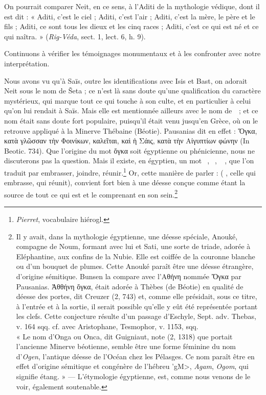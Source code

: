 \documentclass[letterpaper,twocolumn,openany,nodeprecatedcode]{dndbook}
\newcommand*\hieroAAAH{}
\newcommand*\hieroABFY{\raisebox{0.3ex}{}}
\newcommand*\hieroABFZ{}
\newcommand*\hieroABGA{}
\newcommand*\hieroABGB{}
\newcommand*\hieroABGC{}
\newcommand*\hieroABGD{\raisebox{0.3ex}{}}
\newcommand*\hieroABGE{}
\begin{document}
On pourrait comparer Neit, en ce sens, à l'Aditi de la mythologie védique, dont il est dit : « Aditi, c'est le ciel ; Aditi, c'est l'air ; Aditi, c'est la mère, le père et le fils ; Aditi, ce sont tous les dieux et les cinq races ; Aditi, c'est ce qui est né et ce qui naîtra. » (\emph{Rig-Véda}, sect. 1, lect. 6, h. 9).

Continuons à vérifier les témoignages monumentaux et à les confronter avec notre interprétation.

Nous avons vu qu'à Saïs, outre les identifications avec Isis et Bast, on adorait Neit sous le nom de Šeta ; ce n'est là sans doute qu'une qualification du caractère mystérieux, qui marque tout ce qui touche à son culte, et en particulier à celui qu'on lui rendait à Saïs. Mais elle est mentionnée ailleurs avec le nom de $\hieroAAAH\:\hieroABFY$ ; et ce nom était sans doute fort populaire, puisqu'il était venu jusqu'en Grèce, où on le retrouve appliqué à la Minerve Thébaine (Béotie). Pausanias dit en effet : Ὅγκα, κατὰ γλῶσσαν τὴν Φοινίκων, καλεῖται, καὶ ἡ Σάις, κατὰ τὴν Αἰγυπτίων φώνην (In Beotic. 734). Que l'origine du mot ὄγκα soit égyptienne ou phénicienne, nous ne discuterons pas la question. Mais il existe, en égyptien, un mot $\hieroAAAH\:\hieroABFZ\:\hieroABGA$, $\hieroAAAH\:\hieroABGB\:\hieroABGC$, $\hieroAAAH\:\hieroABGD\allowbreak\:\hieroABGE\:\hieroABGA$, que l'on traduit par embrasser, joindre, réunir.\footnote{\emph{Pierret}, vocabulaire hiérogl.} Or, cette manière de parler : ($\hieroAAAH\:\hieroABFY$, celle qui embrasse, qui réunit), convient fort bien à une déesse conçue comme étant la source de tout ce qui est et le comprenant en son sein.\footnote{Il y avait, dans la mythologie égyptienne, une déesse spéciale, Anouké, compagne de Noum, formant avec lui et Sati, une sorte de triade, adorée à Eléphantine, aux confins de la Nubie. Elle est coiffée de la couronne blanche ou d'un bouquet de plumes. Cette Anouké paraît être une déesse étrangère, d'origine sémitique. Bunsen la compare avec l'Αθήνη nommée Ὄγκα par Pausanias. Ἀθθήνη ὄγκα, était adorée à Thèbes (de Béotie) en qualité de déesse des portes, dit Creuzer (2, 743) et, comme elle présidait, sous ce titre, à l'entrée et à la sortie, il serait possible qu'elle y eût été représentée portant les clefs. Cette conjecture résulte d'un passage d'Eschyle, Sept. adv. Thebas, v. 164 sqq. cf. avec Aristophane, Tesmophor, v. 1153, sqq.\\\hspace*{5mm}« Le nom d'Onga ou Onca, dit Guigniaut, note (2, 1318) que portait l'ancienne Minerve béotienne, semble être une forme féminine du nom d'\emph{Ogen}, l'antique déesse de l'Océan chez les Pélasges. Ce nom paraît être en effet d'origine sémitique et congénère de l'hébreu \foreignlanguage{hebrew}{\<'gM>}, \emph{Agam}, \emph{Ogom}, qui signifie étang. » --- L'étymologie égyptienne, est, comme nous venons de le voir, également soutenable.}
\end{document}
